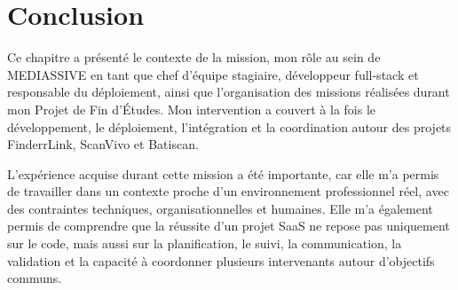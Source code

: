\section{Conclusion}

Ce chapitre a présenté le contexte de la mission, mon rôle au sein de MEDIASSIVE en tant que chef d'équipe stagiaire, développeur full-stack et responsable du déploiement, ainsi que l'organisation des missions réalisées durant mon Projet de Fin d'Études. Mon intervention a couvert à la fois le développement, le déploiement, l'intégration et la coordination autour des projets FinderrLink, ScanVivo et Batiscan.

L'expérience acquise durant cette mission a été importante, car elle m'a permis de travailler dans un contexte proche d'un environnement professionnel réel, avec des contraintes techniques, organisationnelles et humaines. Elle m'a également permis de comprendre que la réussite d'un projet SaaS ne repose pas uniquement sur le code, mais aussi sur la planification, le suivi, la communication, la validation et la capacité à coordonner plusieurs intervenants autour d'objectifs communs.